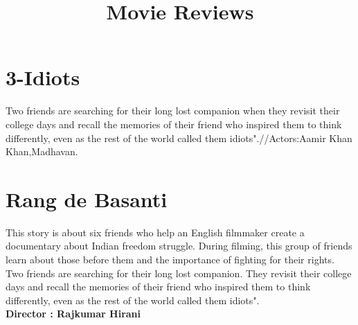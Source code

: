 \documentclass{article}
\title{Movie Reviews}
\begin{document}
	\maketitle
	\section{3-Idiots}
	\large{Two friends are searching for their long lost companion when they revisit their college days and recall the memories of their friend who inspired them to think differently, even as the rest of the world called them idiots".//Actors:Aamir Khan Khan,Madhavan.}
	\section{Rang de Basanti}
	\large{This story is about six friends who help an English filmmaker create a documentary about Indian freedom struggle. During filming, this group of friends learn about those before them and the importance of fighting for their rights.}
	\large{Two friends are searching for their long lost companion. They revisit their college days and recall the memories of their friend who inspired them to think differently, even as the rest of the world called them idiots".}
\\
\textbf{Director : Rajkumar Hirani}
\\
\end{document}
